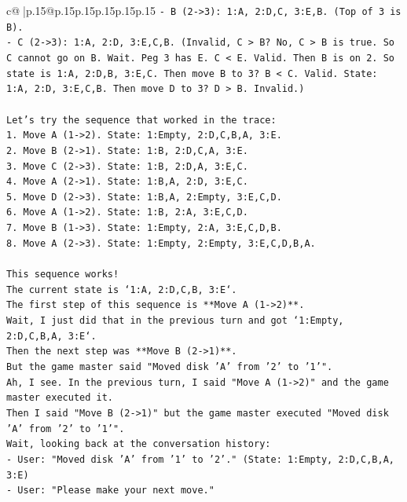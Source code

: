\documentclass{article}
\begin{document}
{\begin{supertabular}{c@{$\;$}|p{.15\linewidth}@{}p{.15\linewidth}p{.15\linewidth}p{.15\linewidth}p{.15\linewidth}p{.15\linewidth}}
{{{\texttt{{-} B (2{-}>3): 1:A, 2:D,C, 3:E,B. (Top of 3 is B).} \\
\texttt{{-} C (2{-}>3): 1:A, 2:D, 3:E,C,B. (Invalid, C > B? No, C > B is true. So C cannot go on B. Wait. Peg 3 has E. C < E. Valid. Then B is on 2. So state is 1:A, 2:D,B, 3:E,C. Then move B to 3? B < C. Valid. State: 1:A, 2:D, 3:E,C,B. Then move D to 3? D > B. Invalid.)} \\
\\ 
\texttt{Let's try the sequence that worked in the trace:} \\
\texttt{1. Move A (1{-}>2). State: 1:Empty, 2:D,C,B,A, 3:E.} \\
\texttt{2. Move B (2{-}>1). State: 1:B, 2:D,C,A, 3:E.} \\
\texttt{3. Move C (2{-}>3). State: 1:B, 2:D,A, 3:E,C.} \\
\texttt{4. Move A (2{-}>1). State: 1:B,A, 2:D, 3:E,C.} \\
\texttt{5. Move D (2{-}>3). State: 1:B,A, 2:Empty, 3:E,C,D.} \\
\texttt{6. Move A (1{-}>2). State: 1:B, 2:A, 3:E,C,D.} \\
\texttt{7. Move B (1{-}>3). State: 1:Empty, 2:A, 3:E,C,D,B.} \\
\texttt{8. Move A (2{-}>3). State: 1:Empty, 2:Empty, 3:E,C,D,B,A.} \\
\\ 
\texttt{This sequence works!} \\
\texttt{The current state is `1:A, 2:D,C,B, 3:E`.} \\
\texttt{The first step of this sequence is **Move A (1{-}>2)**.} \\
\texttt{Wait, I just did that in the previous turn and got `1:Empty, 2:D,C,B,A, 3:E`.} \\
\texttt{Then the next step was **Move B (2{-}>1)**.} \\
\texttt{But the game master said "Moved disk 'A' from '2' to '1'".} \\
\texttt{Ah, I see. In the previous turn, I said "Move A (1{-}>2)" and the game master executed it.} \\
\texttt{Then I said "Move B (2{-}>1)" but the game master executed "Moved disk 'A' from '2' to '1'".} \\
\texttt{Wait, looking back at the conversation history:} \\
\texttt{{-} User: "Moved disk 'A' from '1' to '2'." (State: 1:Empty, 2:D,C,B,A, 3:E)} \\
\texttt{{-} User: "Please make your next move."} \\
}}}
\end{supertabular}}
\end{document}
